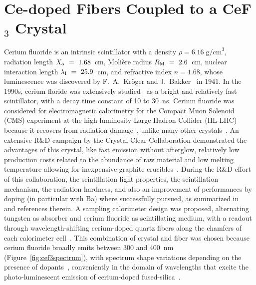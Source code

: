 \documentclass[a4paper,11pt]{article}
\begin{document}
\section{Ce-doped Fibers Coupled to a CeF\texorpdfstring{$_3$}{} Crystal}
\label{sec:WLS}
Cerium fluoride is an intrinsic scintillator with a density $\rho=6.16\; {\mathrm{g/cm}}^3$, radiation length $X_{\rm o}~=~1.68$~cm, Moli\`ere radius $R_{\rm M}~=~2.6$~cm, nuclear interaction length $\lambda_{\rm I}~=~25.9$~cm, and refractive index $n = 1.68$, whose luminescence was discovered by F.~A.~Kr\"oger and J.~Bakker~\cite{r-KRO} in 1941. In the 1990s, cerium floride was extensively studied~\cite{r-AND,r-MOS} as a bright and relatively fast scintillator, with a decay time constant of 10 to 30~ns. Cerium fluoride was considered for electromagnetic calorimetry for the Compact Muon Solenoid (CMS) experiment at the high-luminosity Large Hadron Collider (HL-LHC) because it recovers from radiation damage~\cite{r-NIMCEF3}, unlike many other crystals~\cite{r-FISSNIM, r-NIMLYSO}. An extensive R\&D campaign by the Crystal Clear Collaboration demonstrated the advantages of this crystal, like fast emission without afterglow, relatively low production costs related to the abundance of raw material and low melting temperature allowing for inexpensive
graphite crucibles~\cite{r-EACEF3}. During the R\&D effort of this collaboration, the scintillation light properties, the scintillation mechanism, the radiation hardness, and also an improvement of performances by doping (in particular with Ba) where successfully pursued, as summarized in~\cite{r-EACEF3,r-AUF} and references therein. A sampling calorimeter design was proposed, alternating tungsten as absorber and cerium fluoride as scintillating medium, with a readout through wavelength-shifting cerium-doped quartz fibers along the chamfers of each calorimeter cell~\cite{r-CALORCEF3, r-WCEF3FRA, r-WCEF3H4}. This combination of crystal and fiber was chosen because cerium fluoride broadly emits between 300 and 400~nm (Figure~\ref{fig:cef3spectrum}), with spectrum shape variations depending on the presence of dopants~\cite{r-EACEF3}, conveniently in the domain of wavelengths that excite the photo-luminescent emission of cerium-doped fused-silica~\cite{r-vedda}.
\end{document}
